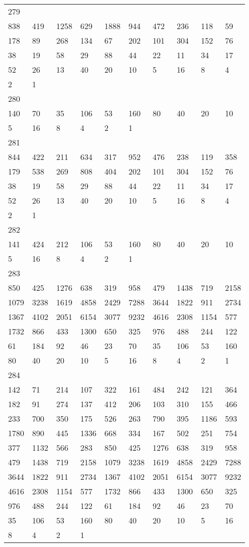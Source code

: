 \begin{longtable}{*{10}{l}}
279&&&&&&&&&\\
838& 419& 1258& 629& 1888& 944& 472& 236& 118& 59\\
178& 89& 268& 134& 67& 202& 101& 304& 152& 76\\
38& 19& 58& 29& 88& 44& 22& 11& 34& 17\\
52& 26& 13& 40& 20& 10& 5& 16& 8& 4\\
2& 1& \\

280&&&&&&&&&\\
140& 70& 35& 106& 53& 160& 80& 40& 20& 10\\
5& 16& 8& 4& 2& 1& \\

281&&&&&&&&&\\
844& 422& 211& 634& 317& 952& 476& 238& 119& 358\\
179& 538& 269& 808& 404& 202& 101& 304& 152& 76\\
38& 19& 58& 29& 88& 44& 22& 11& 34& 17\\
52& 26& 13& 40& 20& 10& 5& 16& 8& 4\\
2& 1& \\

282&&&&&&&&&\\
141& 424& 212& 106& 53& 160& 80& 40& 20& 10\\
5& 16& 8& 4& 2& 1& \\

283&&&&&&&&&\\
850& 425& 1276& 638& 319& 958& 479& 1438& 719& 2158\\
1079& 3238& 1619& 4858& 2429& 7288& 3644& 1822& 911& 2734\\
1367& 4102& 2051& 6154& 3077& 9232& 4616& 2308& 1154& 577\\
1732& 866& 433& 1300& 650& 325& 976& 488& 244& 122\\
61& 184& 92& 46& 23& 70& 35& 106& 53& 160\\
80& 40& 20& 10& 5& 16& 8& 4& 2& 1\\

284&&&&&&&&&\\
142& 71& 214& 107& 322& 161& 484& 242& 121& 364\\
182& 91& 274& 137& 412& 206& 103& 310& 155& 466\\
233& 700& 350& 175& 526& 263& 790& 395& 1186& 593\\
1780& 890& 445& 1336& 668& 334& 167& 502& 251& 754\\
377& 1132& 566& 283& 850& 425& 1276& 638& 319& 958\\
479& 1438& 719& 2158& 1079& 3238& 1619& 4858& 2429& 7288\\
3644& 1822& 911& 2734& 1367& 4102& 2051& 6154& 3077& 9232\\
4616& 2308& 1154& 577& 1732& 866& 433& 1300& 650& 325\\
976& 488& 244& 122& 61& 184& 92& 46& 23& 70\\
35& 106& 53& 160& 80& 40& 20& 10& 5& 16\\
8& 4& 2& 1& \\


\end{longtable}
